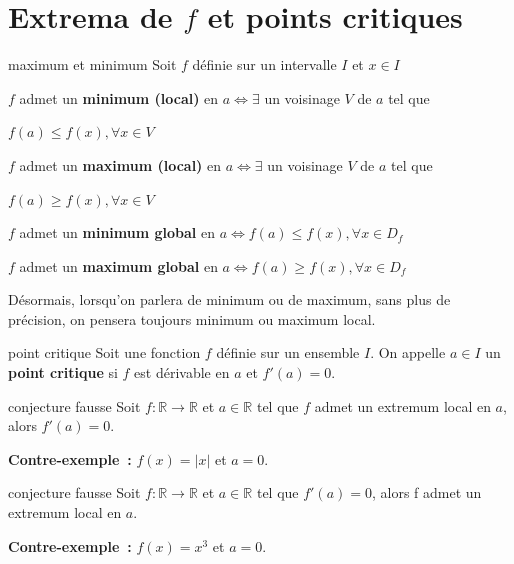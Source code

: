 \documentclass[a4paper,12pt]{article}
\begin{document}
\section{Extrema de $f$ et points critiques}

\begin{definition}
	maximum et minimum
\tcblower
Soit $f$ définie sur un intervalle $I$ et $x \in I$

$f$ admet un \textbf{minimum (local)} en $a \Leftrightarrow \exists$ un voisinage $V$ de $a$ tel que 

$f(a) \leq f(x), \forall x \in V$

$f$ admet un \textbf{maximum (local)} en $a \Leftrightarrow \exists$ un voisinage $V$ de $a$ tel que 

$f(a) \geq f(x), \forall x \in V$

$f$ admet un \textbf{minimum global} en $a \Leftrightarrow f(a) \leq f(x), \forall x \in D_f$

$f$ admet un \textbf{maximum global} en $a \Leftrightarrow f(a) \geq f(x), \forall x \in D_f$

\end{definition}
\begin{remarque}
	\tcblower
Désormais, lorsqu'on parlera de minimum ou de maximum, sans plus de précision, on pensera toujours minimum ou maximum local.
\end{remarque}
\begin{definition}
	point critique
	\tcblower
	Soit une fonction $f$ définie sur un ensemble $I$. On appelle $a\in I$ un {\bfseries point critique} si $f$ est dérivable en $a$ et $f'(a)=0$.
\end{definition}

\begin{remarque}
	conjecture fausse
	\tcblower
	Soit $f:\mathbb{R}\rightarrow \mathbb{R}$ et $a\in \mathbb{R}$ tel que $f$ admet un extremum local en $a$, alors $f'(a)=0$.

	{\bfseries Contre-exemple~:} $f(x)=|x|$ et $a=0$. 
\end{remarque}


\begin{remarque}
	conjecture fausse
	\tcblower
	Soit $f:\mathbb{R}\rightarrow \mathbb{R}$ et $a\in \mathbb{R}$ tel que $f'(a)=0$, alors f admet un extremum local en $a$.

	{\bfseries Contre-exemple~:} $f(x)=x^3$ et $a=0$. 
\end{remarque}
\end{document}
